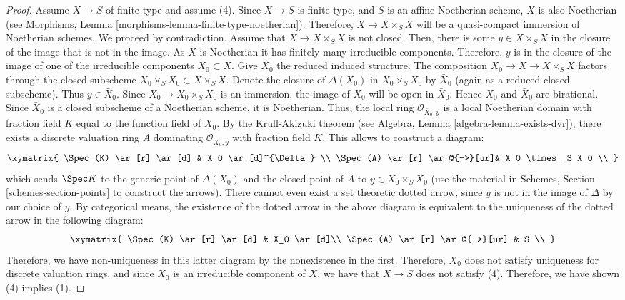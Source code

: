 \begin{proof}
\medskip\noindent
Assume $X \to S$ of finite type and assume (4).
Since $X \to S$ is finite type, and $S$ is an affine Noetherian
scheme, $X$ is also Noetherian (see
Morphisms, Lemma \ref{morphisms-lemma-finite-type-noetherian}).
Therefore, $X \to X \times_S X$ will
be a quasi-compact immersion of Noetherian schemes.  We proceed by
contradiction.  Assume that $X \to X \times_S X$ is not closed.  Then,
there is some $y \in X \times_S X$ in the closure of the image that is
not in the image. As $X$ is Noetherian it has finitely many irreducible
components. Therefore, $y$ is in the closure of the image of one of
the irreducible components $X_0 \subset X$.  Give $X_0$ the reduced
induced structure.  The composition $X_0 \to X \to X \times_S X$
factors through the closed subscheme $X_0 \times_S X_0 \subset X \times_S X$.
Denote the closure of $\Delta(X_0)$ in $X_0 \times_S X_0$
by $\bar X_0$ (again as a reduced closed subscheme). Thus $y \in \bar X_0$.
Since $X_0 \to X_0 \times_S X_0$ is an immersion, the image of $X_0$
will be open in $\bar X_0$. Hence $X_0$ and $\bar X_0$ are
birational. Since $\bar{X}_0$ is a closed subscheme of a
Noetherian scheme, it is Noetherian. Thus, the local ring
$\mathcal O_{{\bar X_0, y}}$ is a local Noetherian domain with fraction
field $K$ equal to the function field of $X_0$.  By the Krull-Akizuki
theorem (see Algebra, Lemma \ref{algebra-lemma-exists-dvr}), there exists a
discrete valuation ring $A$ dominating $\mathcal O_{{\bar X_0, y}}$
with fraction field $K$.  This allows to construct a diagram:
\begin{equation}
\label{equation-valuative-generic}
\xymatrix{
\Spec(K) \ar[r] \ar[d] & X_0 \ar[d]^{\Delta} \\
\Spec(A) \ar[r] \ar@{-->}[ur]& X_0 \times_S X_0 \\
}
\end{equation}
which sends $\Spec K$ to the generic point of $\Delta(X_0)$ and
the closed point of $A$ to $y \in X_0 \times_S X_0$ (use the material in
Schemes, Section \ref{schemes-section-points} to construct the arrows).
There cannot even exist
a set theoretic dotted arrow, since $y$ is not in the image of
$\Delta$ by our choice of $y$.  By categorical means, the existence of
the dotted arrow in the above diagram is equivalent to the uniqueness
of the dotted arrow in the following diagram:
\begin{equation}
\label{equation-valuative-nonexistent}
\xymatrix{
\Spec(K) \ar[r] \ar[d] & X_0 \ar[d]\\
\Spec(A) \ar[r] \ar@{-->}[ur] & S \\
}
\end{equation}
Therefore, we have non-uniqueness in this latter diagram by the
nonexistence in the first.  Therefore, $X_0$ does not satisfy
uniqueness for discrete valuation rings, and since $X_0$ is an
irreducible component of $X$, we have that $X \to S$ does not satisfy
(4).  Therefore, we have shown (4) implies (1).
\end{proof}


